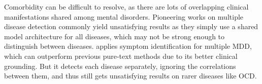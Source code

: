 
Comorbidity can be difficult to resolve, as there are lots of overlapping clinical manifestations shared among mental disorders. Pioneering works on multiple disease detection \cite{cohan2018smhd, sekulic2019adapting} commonly yield unsatisfying results as they simply use a shared model architecture for all diseases, which may not be strong enough to distinguish between diseases. \citet{Zhang2022SymptomIF} applies symptom identification for multiple MDD, which can outperform previous pure-text methods due to its better clinical grounding. But it detects each disease separately, ignoring the correlations between them, and thus still gets unsatisfying results on rarer diseases like OCD.


